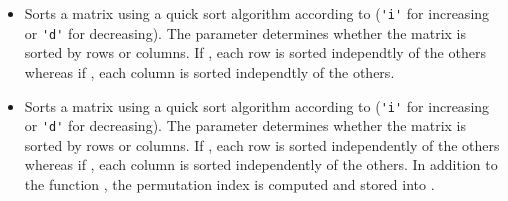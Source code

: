 \begin{itemize}
\item {}
  \sshortdescribe Sorts a matrix using a quick sort algorithm according to
   (\verb!'i'! for increasing or \verb!'d'! for decreasing). The parameter  determines
  whether the matrix is sorted by rows or columns. If , each row
  is sorted independtly of the others whereas if , each column
  is sorted independtly of the others.

\item {}
  \sshortdescribe Sorts a matrix using a quick sort algorithm according to
   (\verb!'i'! for increasing or \verb!'d'! for decreasing). The
  parameter  determines whether the matrix is sorted by rows or
  columns. If , each row is sorted independently of the others
  whereas if , each column is sorted independently of the
  others. In addition to the function , the permutation
  index is computed and stored into .
\end{itemize}


